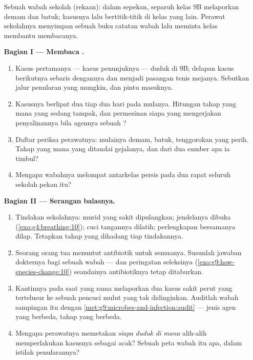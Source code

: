 \begin{problem}\label{pb:g9:microbes-and-infection:1}
Sebuah wabah sekolah (rekaan): dalam sepekan, separuh kelas
9B melaporkan demam dan batuk; kasusnya lalu bertitik-titik
di kelas yang lain. Perawat sekolahnya menyimpan sebuah buku
catatan wabah lalu meminta kelas  membantu
membacanya.

\medskip\noindent\textbf{Bagian I --- Membaca .}
\begin{enumerate}
  \item Kasus pertamanya --- kasus penunjuknya --- duduk di
        9B; delapan kasus berikutnya sebaris dengannya dan
        menjadi pasangan tenis mejanya. Sebutkan jalur
        penularan yang mungkin, dan pintu masuknya.
  \item Kasusnya berlipat dua tiap dua hari pada mulanya.
        Hitungan tahap yang mana yang sedang tampak, dan
        permesinan siapa yang mengerjakan penyalinannya bila
        agennya sebuah ?
  \item Daftar periksa perawatnya: mulainya demam, batuk,
        tenggorokan yang perih. Tahap yang mana yang ditandai
        gejalanya, dan dari dua sumber apa ia timbul?
  \item Mengapa wabahnya melompat antarkelas persis pada dua
        rapat seluruh sekolah pekan itu?
\end{enumerate}

\medskip\noindent\textbf{Bagian II --- Serangan balasnya.}
\begin{enumerate}[resume]
  \item Tindakan sekolahnya: murid yang sakit dipulangkan;
        jendelanya dibuka (\cref{exo:g4:breathing:10}); cuci
        tangannya dilatih; perlengkapan bersamanya dilap.
        Tetapkan tahap yang dihadang tiap tindakannya.
  \item Seorang orang tua menuntut antibiotik untuk semuanya.
        Susunlah jawaban dokternya bagi sebuah wabah 
        --- dan peringatan seleksinya
        (\cref{exo:g9:how-species-change:10}) seandainya
        antibiotiknya tetap ditaburkan.
  \item Kantinnya pada saat yang sama melaporkan dua kasus
        sakit perut yang tertelusur ke sebuah pencuci mulut
        yang tak didinginkan. Auditlah wabah sampingan itu
        dengan \cref{met:g9:microbes-and-infection:audit} ---
        jenis agen yang berbeda, tahap yang berbeda.
  \item Mengapa perawatnya memetakan \emph{siapa duduk di
        mana} alih-alih memperlakukan kasusnya sebagai acak?
        Sebuah peta wabah itu apa, dalam istilah penularannya?
\end{enumerate}


\end{problem}
